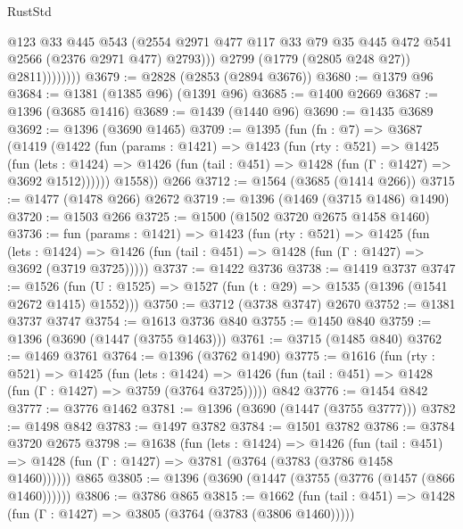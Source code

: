 \begin{lexlean}{RustStd}
\begin{coremodule}
                        @123
                        @33
                        @445
                        @543
                        (@2554
                          @2971
                          @477
                          @117
                          @33
                          @79
                          @35
                          @445
                          @472
                          @541
                          @2566
                          (@2376 @2971 @477)
                          @2793)))
                    @2799
                    (@1779 (@2805 @248 @27))
                    @2811))))))))
@3679 := @2828 (@2853 (@2894 @3676))
@3680 := @1379 @96
@3684 := @1381 (@1385 @96) (@1391 @96)
@3685 := @1400 @2669
@3687 := @1396 (@3685 @1416)
@3689 := @1439 (@1440 @96)
@3690 := @1435 @3689
@3692 := @1396 (@3690 @1465)
@3709 := @1395
    (fun (fn : @7) =>
    @3687
      (@1419
        (@1422
          (fun (params : @1421) =>
          @1423
            (fun (rty : @521) =>
            @1425
              (fun (lets : @1424) =>
              @1426 (fun (tail : @451) => @1428 (fun (Γ : @1427) => @3692 @1512))))))
        @1558))
    @266
@3712 := @1564 (@3685 (@1414 @266))
@3715 := @1477 (@1478 @266) @2672
@3719 := @1396 (@1469 (@3715 @1486) @1490)
@3720 := @1503 @266
@3725 := @1500 (@1502 @3720 @2675 @1458 @1460)
@3736 := fun (params : @1421) =>
  @1423
    (fun (rty : @521) =>
    @1425
      (fun (lets : @1424) =>
      @1426 (fun (tail : @451) => @1428 (fun (Γ : @1427) => @3692 (@3719 @3725)))))
@3737 := @1422 @3736
@3738 := @1419 @3737
@3747 := @1526 (fun (U : @1525) => @1527 (fun (t : @29) => @1535 (@1396 (@1541 @2672 @1415) @1552)))
@3750 := @3712 (@3738 @3747) @2670
@3752 := @1381 @3737 @3747
@3754 := @1613 @3736 @840
@3755 := @1450 @840
@3759 := @1396 (@3690 (@1447 (@3755 @1463)))
@3761 := @3715 (@1485 @840)
@3762 := @1469 @3761
@3764 := @1396 (@3762 @1490)
@3775 := @1616
    (fun (rty : @521) =>
    @1425
      (fun (lets : @1424) =>
      @1426 (fun (tail : @451) => @1428 (fun (Γ : @1427) => @3759 (@3764 @3725)))))
    @842
@3776 := @1454 @842
@3777 := @3776 @1462
@3781 := @1396 (@3690 (@1447 (@3755 @3777)))
@3782 := @1498 @842
@3783 := @1497 @3782
@3784 := @1501 @3782
@3786 := @3784 @3720 @2675
@3798 := @1638
    (fun (lets : @1424) =>
    @1426
      (fun (tail : @451) => @1428 (fun (Γ : @1427) => @3781 (@3764 (@3783 (@3786 @1458 @1460))))))
    @865
@3805 := @1396 (@3690 (@1447 (@3755 (@3776 (@1457 (@866 @1460))))))
@3806 := @3786 @865
@3815 := @1662
    (fun (tail : @451) => @1428 (fun (Γ : @1427) => @3805 (@3764 (@3783 (@3806 @1460)))))

\end{coremodule}
\end{lexlean}
